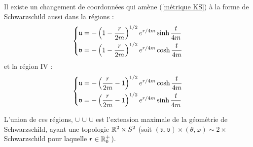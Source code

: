 \begin{rmk}
    Il existe un changement de coordonnées qui amène (\ref{métrique KS}) à la forme de Schwarzschild aussi dans la régions  :
    \begin{equation}
        \begin{dcases}
            \mathfrak{u} =  -\left( 1 - \frac{r}{2m} \right)^{1/2} e^{r/4m} \sinh \frac{t}{4m}\\
        \mathfrak{v} = - \left( 1 - \frac{r}{2m}\right)^{1/2} e^{r/4m} \cosh \frac{t}{4m}
        \end{dcases}
    \end{equation}
    et la région IV :
    \begin{equation}
        \begin{dcases}
            \mathfrak{u} = - \left( \frac{r}{2m} -1 \right)^{1/2} e^{r/4m} \cosh \frac{t}{4m}\\
            \mathfrak{v} = - \left( \frac{r}{2m} -1 \right)^{1/2} e^{r/4m} \sinh \frac{t}{4m}
        \end{dcases}
    \end{equation}
\end{rmk}
\begin{rmk}
    L'union de ces régions,  $\cup$  $\cup$  $\cup$  est l'extension maximale de la géométrie de Schwarzschild, ayant une topologie $\mathbb{R}^2 \times S^2$ (soit $(\mathfrak{u},\mathfrak{v}) \times (\theta,\varphi) \sim 2 \times$ Schwarzschild pour laquelle $r\in \mathbb{R}^+_0$).
\end{rmk}
